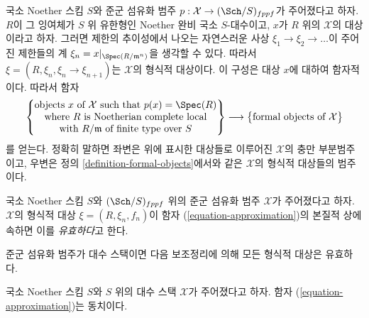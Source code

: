 \noindent
국소 Noether 스킴 $S$와 준군 섬유화 범주
$p : \mathcal{X} \to (\Sch/S)_{fppf}$가 주어졌다고 하자.
$R$이 그 잉여체가 $S$ 위 유한형인 Noether 완비 국소 $S$-대수이고,
$x$가 $R$ 위의 $\mathcal{X}$의 대상이라고 하자. 그러면 제한의 추이성에서
나오는 자연스러운 사상 $\xi_1 \to \xi_2 \to \ldots$이 주어진 제한들의 계
$\xi_n = x|_{\Spec(R/\mathfrak m^n)}$을 생각할 수 있다. 따라서
$\xi = (R, \xi_n, \xi_n \to \xi_{n + 1})$는 $\mathcal{X}$의 형식적
대상이다. 이 구성은 대상 $x$에 대하여 함자적이다. 따라서 함자
\begin{equation}
\label{equation-approximation}
\left\{
\begin{matrix}
\text{objects }x\text{ of }\mathcal{X} \text{ such that }p(x) = \Spec(R) \\
\text{where }R\text{ is Noetherian complete local}\\
\text{with }R/\mathfrak m\text{ of finite type over }S
\end{matrix}
\right\}
\longrightarrow
\left\{
\begin{matrix}
\text{formal objects of }\mathcal{X}
\end{matrix}
\right\}
\end{equation}
를 얻는다. 정확히 말하면 좌변은 위에 표시한 대상들로 이루어진
$\mathcal{X}$의 충만 부분범주이고, 우변은 정의
\ref{definition-formal-objects}에서와 같은 $\mathcal{X}$의 형식적
대상들의 범주이다.

\begin{definition}
\label{definition-effective}
국소 Noether 스킴 $S$와 $(\Sch/S)_{fppf}$ 위의 준군 섬유화 범주
$\mathcal{X}$가 주어졌다고 하자. $\mathcal{X}$의 형식적 대상
$\xi = (R, \xi_n, f_n)$이 함자 (\ref{equation-approximation})의
본질적 상에 속하면 이를 {\it 유효하다}고 한다.
\end{definition}

\noindent
준군 섬유화 범주가 대수 스택이면 다음 보조정리에 의해 모든 형식적
대상은 유효하다.

\begin{lemma}
\label{lemma-effective}
국소 Noether 스킴 $S$와 $S$ 위의 대수 스택 $\mathcal{X}$가
주어졌다고 하자. 함자 (\ref{equation-approximation})는 동치이다.
\end{lemma}

